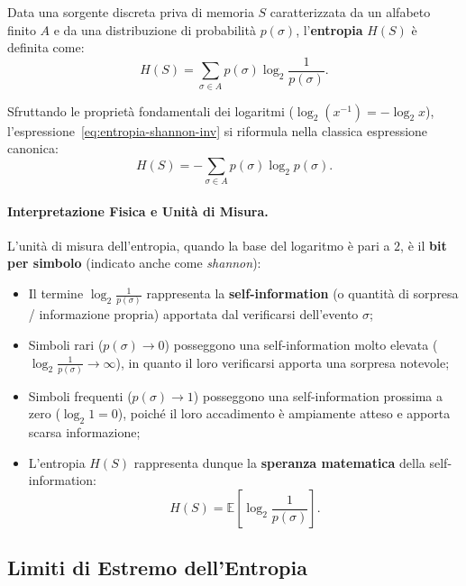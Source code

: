 \begin{definition}
Data una sorgente discreta priva di memoria $S$ caratterizzata da un alfabeto finito $A$ e da una distribuzione di probabilit\`a $p(\sigma)$, l'\textbf{entropia} $H(S)$ \`e definita come:
\begin{equation}
  H(S) = \sum_{\sigma \in A} p(\sigma) \log_2 \frac{1}{p(\sigma)}.
  \label{eq:entropia-shannon-inv}
\end{equation}
\end{definition}

Sfruttando le propriet\`a fondamentali dei logaritmi ($\log_2 (x^{-1}) = -\log_2 x$), l'espressione~\eqref{eq:entropia-shannon-inv} si riformula nella classica espressione canonica:
\begin{equation}
  H(S) = -\sum_{\sigma \in A} p(\sigma) \log_2 p(\sigma).
  \label{eq:entropia-shannon-canonica}
\end{equation}

\paragraph{Interpretazione Fisica e Unit\`a di Misura.}
L'unit\`a di misura dell'entropia, quando la base del logaritmo \`e pari a $2$, \`e il \textbf{bit per simbolo} (indicato anche come \textit{shannon}):
\begin{itemize}
  \item Il termine $\log_2 \frac{1}{p(\sigma)}$ rappresenta la \textbf{self-information} (o quantit\`a di sorpresa / informazione propria) apportata dal verificarsi dell'evento $\sigma$;
  \item Simboli rari ($p(\sigma) \to 0$) posseggono una self-information molto elevata ($\log_2 \frac{1}{p(\sigma)} \to \infty$), in quanto il loro verificarsi apporta una sorpresa notevole;
  \item Simboli frequenti ($p(\sigma) \to 1$) posseggono una self-information prossima a zero ($\log_2 1 = 0$), poich\'e il loro accadimento \`e ampiamente atteso e apporta scarsa informazione;
  \item L'entropia $H(S)$ rappresenta dunque la \textbf{speranza matematica} della self-information:
  \begin{equation}
    H(S) = \mathbb{E}\left[\log_2 \frac{1}{p(\sigma)}\right].
  \end{equation}
\end{itemize}

\FloatBarrier
\subsection{Limiti di Estremo dell'Entropia}
\label{subsec:limiti-entropia}

